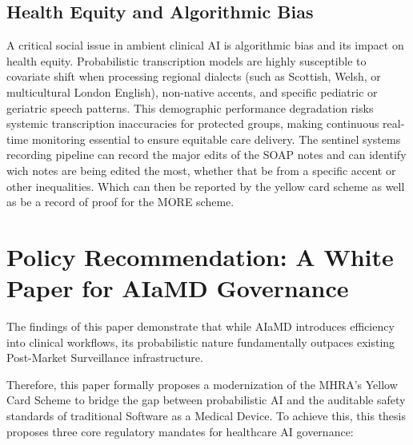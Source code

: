 \documentclass[11pt,a4paper]{article}
\begin{document}
\subsection{Health Equity and Algorithmic Bias}
A critical social issue in ambient clinical AI is algorithmic bias and its impact on health equity. Probabilistic transcription models are highly susceptible to covariate shift  when processing regional dialects (such as Scottish, Welsh, or multicultural London English), non-native accents, and specific pediatric or geriatric speech patterns. This demographic performance degradation risks systemic transcription inaccuracies for protected groups, making continuous real-time monitoring essential to ensure equitable care delivery. The sentinel systems recording pipeline can record the major edits of the SOAP notes and can identify wich notes are being edited the most, whether that be from a specific accent or other inequalities. Which can then be reported by the yellow card scheme as well as be a record of proof for the MORE scheme.



 

 \section{Policy Recommendation: A White Paper for AIaMD Governance}
 \label{sec:Policy Recommendation: A White Paper for AIaMD Governance}

The findings of this paper demonstrate that while AIaMD introduces efficiency into clinical workflows, its probabilistic nature fundamentally outpaces existing Post-Market Surveillance infrastructure.

Therefore, this paper formally proposes a modernization of the MHRA's Yellow Card Scheme to bridge the gap between probabilistic AI and the auditable safety standards of traditional Software as a Medical Device.  To achieve this, this thesis proposes three core regulatory mandates for healthcare AI governance:
\end{document}
